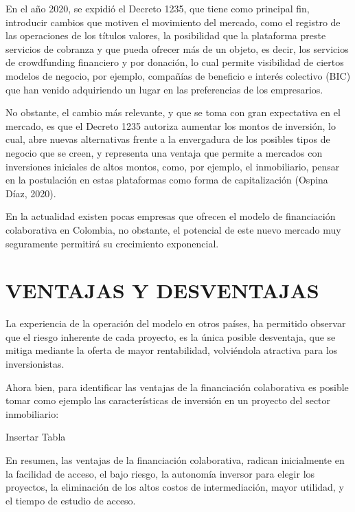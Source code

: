 \documentclass[
]{book}
\begin{document}
En el año 2020, se expidió el Decreto 1235, que tiene como principal fin, introducir cambios que motiven el movimiento del mercado, como el registro de las operaciones de los títulos valores, la posibilidad que la plataforma preste servicios de cobranza y que pueda ofrecer más de un objeto, es decir, los servicios de crowdfunding financiero y por donación, lo cual permite visibilidad de ciertos modelos de negocio, por ejemplo, compañías de beneficio e interés colectivo (BIC) que han venido adquiriendo un lugar en las preferencias de los empresarios.

No obstante, el cambio más relevante, y que se toma con gran expectativa en el mercado, es que el Decreto 1235 autoriza aumentar los montos de inversión, lo cual, abre nuevas alternativas frente a la envergadura de los posibles tipos de negocio que se creen, y representa una ventaja que permite a mercados con inversiones iniciales de altos montos, como, por ejemplo, el inmobiliario, pensar en la postulación en estas plataformas como forma de capitalización (Ospina Díaz, 2020).

En la actualidad existen pocas empresas que ofrecen el modelo de financiación colaborativa en Colombia, no obstante, el potencial de este nuevo mercado muy seguramente permitirá su crecimiento exponencial.

\hypertarget{ventajas-y-desventajas}{%
\chapter{VENTAJAS Y DESVENTAJAS}\label{ventajas-y-desventajas}}

La experiencia de la operación del modelo en otros países, ha permitido observar que el riesgo inherente de cada proyecto, es la única posible desventaja, que se mitiga mediante la oferta de mayor rentabilidad, volviéndola atractiva para los inversionistas.

Ahora bien, para identificar las ventajas de la financiación colaborativa es posible tomar como ejemplo las características de inversión en un proyecto del sector inmobiliario:

Insertar Tabla

En resumen, las ventajas de la financiación colaborativa, radican inicialmente en la facilidad de acceso, el bajo riesgo, la autonomía inversor para elegir los proyectos, la eliminación de los altos costos de intermediación, mayor utilidad, y el tiempo de estudio de acceso.

  
\end{document}
